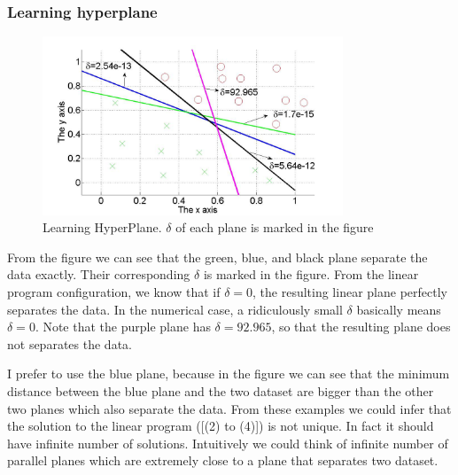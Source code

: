\subsubsection{Learning hyperplane}
\begin{figure}[h!]
	\centering
	\includegraphics[width=0.8\textwidth]{LearnHyperPlane}
	\caption{Learning HyperPlane. $\delta$ of each plane is marked in the figure}
\end{figure}
\noindent From the figure we can see that the green, blue, and black plane separate the data exactly. Their corresponding $\delta$ is marked in the figure. From the linear program configuration, we know that if $\delta=0$, the resulting linear plane perfectly separates the data. In the numerical case, a ridiculously small $\delta$ basically means $\delta=0$. Note that the purple plane has $\delta=92.965$, so that the resulting plane does not separates the data.

\noindent I prefer to use the blue plane, because in the figure we can see that the minimum distance between the blue plane and the two dataset are bigger than the other two planes which also separate the data. From these examples we could infer that the solution to the linear program ([(2) to (4)]) is not unique. In fact it should have infinite number of solutions. Intuitively we could think of infinite number of parallel planes which are extremely close to a plane that separates two dataset. 



